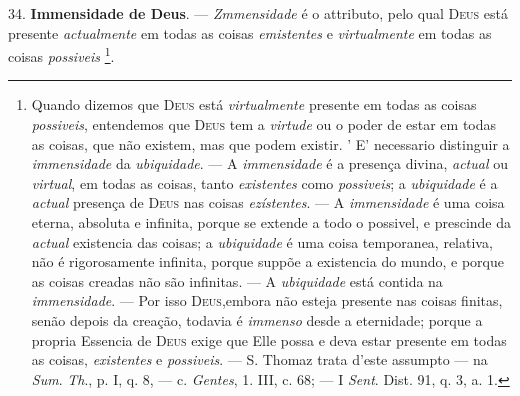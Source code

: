 34. \textbf{Immensidade de Deus}. --- \emph{Zmmensidade} é o attributo, pelo qual \textsc{Deus} está presente \emph{actualmente} em todas as coisas \emph{emistentes} e \emph{virtualmente} em todas as coisas \emph{possiveis} \footnote{Quando dizemos que \textsc{Deus} está \emph{virtualmente} presente em todas as coisas \emph{possiveis}, entendemos que \textsc{Deus} tem a \emph{virtude} ou o poder de estar em todas as coisas, que não existem, mas que podem existir. ' E' necessario distinguir a \emph{immensidade} da \emph{ubiquidade}. --- A \emph{immensidade} é a presença divina, \emph{actual} ou \emph{virtual}, em todas as coisas, tanto \emph{existentes} como \emph{possiveis}; a \emph{ubiquidade} é a \emph{actual} presença de \textsc{Deus} nas coisas \emph{ezístentes}. --- A \emph{immensidade} é uma coisa eterna, absoluta e infinita, porque se extende a todo o possivel, e prescinde da \emph{actual} existencia das coisas; a \emph{ubiquidade} é uma coisa temporanea, relativa, não é rigorosamente infinita, porque suppõe a existencia do mundo, e porque as coisas creadas não são infinitas. --- A \emph{ubiquidade} está contida na \emph{immensidade}. --- Por isso \textsc{Deus},embora não esteja presente nas coisas finitas, senão depois da creação, todavia é \emph{immenso} desde a eternidade; porque a propria Essencia de \textsc{Deus} exige que Elle possa e deva estar presente em todas as coisas, \emph{existentes} e \emph{possiveis}. --- S. Thomaz trata d'este assumpto --- na \emph{Sum}. \emph{Th}., p. I, q. 8, --- c. \emph{Gentes}, 1. III, c. 68; --- I \emph{Sent}. Dist. 91, q. 3, a. 1.}.

